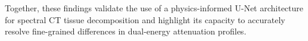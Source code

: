 Together, these findings validate the use of a physics-informed U-Net architecture for spectral CT tissue decomposition 
and highlight its capacity to accurately resolve fine-grained differences in dual-energy attenuation profiles.





